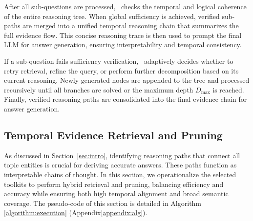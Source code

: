 After all sub-questions are processed, \mot\ checks the temporal and logical coherence of the entire reasoning tree. 
When global sufficiency is achieved, verified sub-paths are merged into a unified temporal reasoning chain that summarizes the full evidence flow. 
This concise reasoning trace is then used to prompt the final LLM for answer generation, ensuring interpretability and temporal consistency.

If a sub-question fails sufficiency verification, \mot\ adaptively decides whether to retry retrieval, refine the query, or perform further decomposition based on its current reasoning. 
Newly generated nodes are appended to the tree and processed recursively until all branches are solved or the maximum depth $D_{\max}$ is reached. 
Finally, verified reasoning paths are consolidated into the final evidence chain for answer generation.
\vspace{-2mm}
\subsection{Temporal Evidence Retrieval and Pruning}
\label{sec:retrieval}
As discussed in Section~\ref{sec:intro}, identifying reasoning paths that connect all topic entities is crucial for deriving accurate answers.  These paths function as interpretable chains of thought.
In this section, we operationalize the selected toolkits to perform hybrid retrieval and pruning, 
balancing {efficiency} and {accuracy} while ensuring both high temporal alignment and broad semantic coverage.
The pseudo-code of this section is detailed in Algorithm \ref{algorithm:execution} (Appendix\ref{appendix:alg}).


